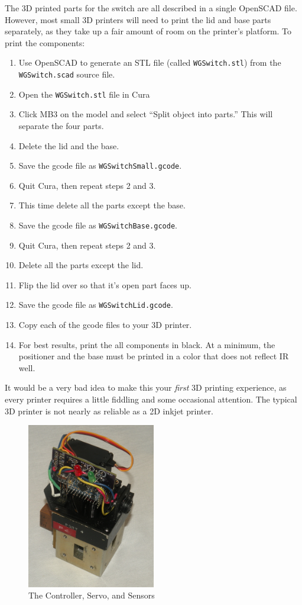 \documentclass[12pt]{article}
\begin{document}
The 3D printed parts for the switch are all described in a single
OpenSCAD file.  However, most small 3D printers will need to print
the lid and base parts separately, as they take up a fair amount
of room on the printer's platform.
To print the components:
\begin{enumerate}
\setlength\itemsep{0em}
\item Use OpenSCAD to generate an STL file (called {\tt WGSwitch.stl}) from
  the {\tt WGSwitch.scad} source file.
\item Open the {\tt WGSwitch.stl} file in Cura
\item Click MB3 on the model and select ``Split object into parts.''
  This will separate the four parts.
\item Delete the lid and the  base.
\item Save the gcode file as {\tt WGSwitchSmall.gcode}.
\item Quit Cura, then repeat steps 2 and 3.
\item This time delete all the parts except the base.
\item Save the gcode file as {\tt WGSwitchBase.gcode}.
\item Quit Cura, then repeat steps 2 and 3.
\item Delete all the parts except the lid.
\item Flip the lid over so that it's open part faces up.
\item Save the gcode file as {\tt WGSwitchLid.gcode}.
\item Copy each of the gcode files to your 3D printer.
\item For best results, print the all components in black.
  At a minimum, the positioner and the base must be printed
  in a color that does not reflect IR well.
  \end{enumerate}

It would be a very bad idea to make this your {\em first} 3D printing
experience, as every printer requires a little fiddling and some
occasional attention.  The typical 3D printer is not nearly as
reliable as a 2D inkjet printer.

\begin{figure}[tb]
  \centering
  \includegraphics[width=0.5\textwidth]{BareModule.jpg}
  \caption{\label{f_naked_switch}The Controller, Servo, and Sensors}
\end{figure}
\end{document}

